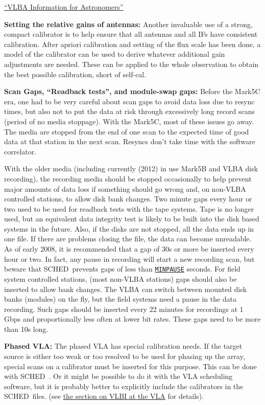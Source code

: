 \documentclass{report}
\newcommand{\schedb}{{\sc SCHED~}}
\begin{document}
\begin{list}{}{\parsep .5em  \itemsep .5em }
{\href{http://www.vlba.nrao.edu/astro}{``VLBA Information for Astronomers''}}

\item {\bf Setting the relative gains of antennas:}  Another invaluable
use of a strong, compact calibrator is to help ensure that all antennas
and all IFs have consistent calibration.  After apriori calibration
and setting of the flux scale has been done, a model of the calibrator
can be used to derive whatever additional gain adjustments are needed.
These can be applied to the whole observation to obtain the best possible
calibration, short of self-cal.


\item {\bf Scan Gaps, ``Readback tests'', and module-swap gaps:}  Before
the Mark5C era, one had to be very careful about scan gaps to avoid
data loss due to resync times, but also not to put the data at risk
through excessively long record scans (period of no media stoppage).  With
the Mark5C, most of these issues go away.  The media are stopped from
the end of one scan to the expected time of good data at that station
in the next scan.  Resyncs don't take time with the software correlator.

With the older media (including currently (2012) in use Mark5B and
VLBA disk recording), the recording media should be stopped
occasionally to help prevent major amounts of data loss if something
should go wrong and, on non-VLBA controlled stations, to allow disk
bank changes.  Two minute gaps every hour or two used to be used for
readback tests with the tape systems.  Tape is no longer used, but an
equivalent data integrity test is likely to be built into the disk
based systems in the future.  Also, if the disks are not stopped, all
the data ends up in one file. If there are problems closing the file,
the data can become unreadable.  As of early 2008, it is recommended
that a gap of 30s or more be inserted every hour or two.  In fact, any
pause in recording will start a new recording scan, but beware that
\schedb prevents gaps of less than 
{\hyperref[MP:MINPAUSE]{{\tt MINPAUSE}}}
seconds.  For field system controlled
stations, (most non-VLBA stations) gaps should also be inserted to
allow bank changes.  The VLBA can switch between mounted disk banks
(modules) on the fly, but the field systems need a pause in the data
recording.  Such gaps should be inserted every 22 minutes for
recordings at 1 Gbps and proportionally less often at lower bit rates.
These gaps need to be more than 10s long.


\item {\bf Phased VLA:} The phased VLA has special calibration needs.
If the target source is either too weak or too resolved to be used for
phasing up the array, special scans on a calibrator must be inserted
for this purpose.  This can be done with \schedb.  Or it might be
possible to do it with the VLA scheduling software, but it is probably
better to explicitly include the calibrators in the \schedb files.  
(see
\hyperref[SEC:VLA]{the section on VLBI at the VLA}
for details).


\end{list}
\end{document}
